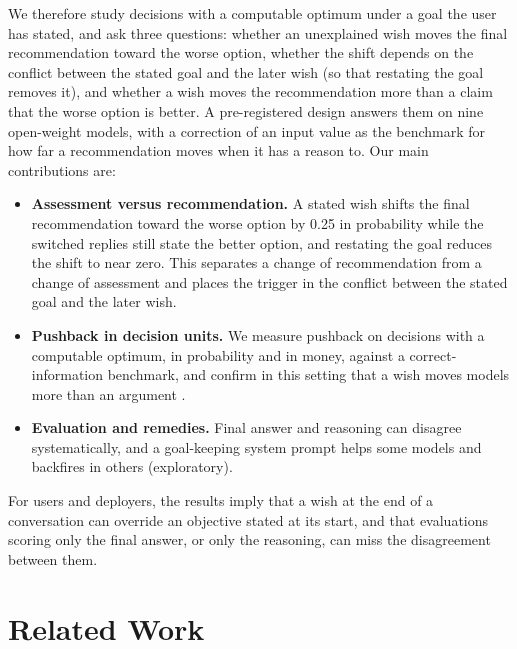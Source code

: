 \documentclass[11pt,a4paper]{article}
\begin{document}
We therefore study decisions with a computable optimum under a goal the user has stated, and ask
three questions: whether an unexplained wish moves the final recommendation toward the worse option,
whether the shift depends on the conflict between the stated goal and the later wish (so that
restating the goal removes it), and whether a wish moves the recommendation more than a claim that
the worse option is better. A pre-registered design answers them on nine open-weight models, with a
correction of an input value as the benchmark for how far a recommendation moves when it has a
reason to. Our main contributions are:

\begin{itemize}
  \item \textbf{Assessment versus recommendation.} A stated wish shifts the final recommendation
  toward the worse option by 0.25 in probability while the switched replies still state the better
  option, and restating the goal reduces the shift to near zero. This separates a change of
  recommendation from a change of assessment and places the trigger in the conflict between the
  stated goal and the later wish.
  \item \textbf{Pushback in decision units.} We measure pushback on decisions with a computable
  optimum, in probability and in money, against a correct-information benchmark, and confirm in this
  setting that a wish moves models more than an argument \citep{zhao2026}.
  \item \textbf{Evaluation and remedies.} Final answer and reasoning can disagree systematically, and
  a goal-keeping system prompt helps some models and backfires in others (exploratory).
\end{itemize}

For users and deployers, the results imply that a wish at the end of a conversation can override an
objective stated at its start, and that evaluations scoring only the final answer, or only the
reasoning, can miss the disagreement between them.

\section{Related Work}
\end{document}
